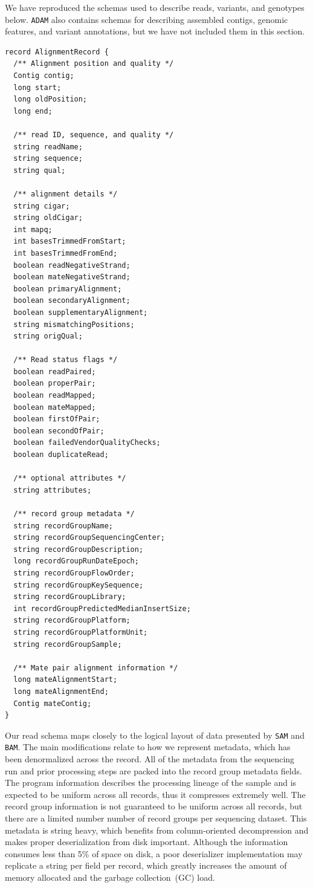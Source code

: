 \documentclass[phd]{ucbthesis}
\begin{document}
We have reproduced the schemas used to describe reads, variants, and genotypes below. \texttt{ADAM} also
contains schemas for describing assembled contigs, genomic features, and variant annotations, but we have
not included them in this section.

\begin{lstlisting}[caption=\texttt{ADAM} read schema]
record AlignmentRecord {
  /** Alignment position and quality */
  Contig contig;
  long start;
  long oldPosition;
  long end;

  /** read ID, sequence, and quality */
  string readName;
  string sequence;
  string qual;
  
  /** alignment details */
  string cigar;
  string oldCigar;
  int mapq;
  int basesTrimmedFromStart;
  int basesTrimmedFromEnd;
  boolean readNegativeStrand;
  boolean mateNegativeStrand;
  boolean primaryAlignment;
  boolean secondaryAlignment;
  boolean supplementaryAlignment;
  string mismatchingPositions;
  string origQual;

  /** Read status flags */
  boolean readPaired;
  boolean properPair;
  boolean readMapped;
  boolean mateMapped;
  boolean firstOfPair;
  boolean secondOfPair;
  boolean failedVendorQualityChecks;
  boolean duplicateRead;

  /** optional attributes */
  string attributes;

  /** record group metadata */
  string recordGroupName;
  string recordGroupSequencingCenter;
  string recordGroupDescription;
  long recordGroupRunDateEpoch;
  string recordGroupFlowOrder;
  string recordGroupKeySequence;
  string recordGroupLibrary;
  int recordGroupPredictedMedianInsertSize;
  string recordGroupPlatform;
  string recordGroupPlatformUnit;
  string recordGroupSample;

  /** Mate pair alignment information */
  long mateAlignmentStart;
  long mateAlignmentEnd;
  Contig mateContig;
}
\end{lstlisting}

Our read schema maps closely to the logical layout of data presented by \texttt{SAM} and \texttt{BAM}.
The main modifications relate to how we represent metadata, which has been denormalized across the record.
All of the metadata from the sequencing run and prior processing steps are packed into the record
group metadata fields. The program information describes the processing lineage of the sample and
is expected to be uniform across all records, thus it compresses extremely well. The record group
information is not guaranteed to be uniform across all records, but there are a limited number number
of record groups per sequencing dataset. This
metadata is string heavy, which benefits from column-oriented decompression and makes proper deserialization from disk important. Although the
information consumes less than 5\% of space on disk, a poor deserializer implementation may replicate
a string per field per record, which greatly increases the amount of memory allocated and the garbage
collection~(GC) load.
\end{document}
